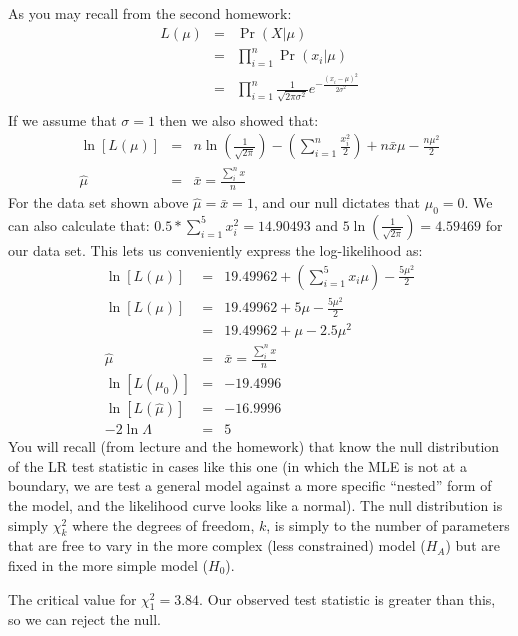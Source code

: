 \documentclass[11pt]{article}
\begin{document}
As you may recall from the second homework:
\begin{eqnarray*}
	L(\mu) & = &\Pr(X|\mu) \\
		& = & \prod_{i=1}^{n}\Pr(x_i|\mu)\\
		& = & \prod_{i=1}^{n}\frac{1}{\sqrt{2\pi\sigma^2}}e^{-\frac{(x_i-\mu)^2}{2\sigma^2}} \\
\end{eqnarray*}
If we assume that $\sigma=1$ then we also showed that:
\begin{eqnarray*}
	\ln [L(\mu)] & = & n\ln\left(\frac{1}{\sqrt{2\pi}}\right) - \left(\sum_{i=1}^{n}\frac{x_i^2}{2}\right) + n\bar{x}\mu - \frac{n\mu^2}{2} \\
	\hat{\mu} & = & \bar{x} = \frac{\sum_i^n x}{n}
\end{eqnarray*}
For the data set shown above $\hat{\mu} = \bar{x} = 1$, and our null dictates that $\mu_0 = 0$.  We can also calculate that: $0.5*\sum_{i=1}^{5}x_i^2 = 14.90493$ and $5\ln\left(\frac{1}{\sqrt{2\pi}}\right) = 4.59469$ for our data set.
This lets us conveniently express the log-likelihood as:
\begin{eqnarray*}
	\ln [L(\mu)] & = & 19.49962 + \left(\sum_{i=1}^{5}x_i\mu\right) - \frac{5\mu^2}{2} \\
	\ln [L(\mu)] & = & 19.49962 + 5\mu - \frac{5\mu^2}{2} \\
		& = & 19.49962 + \mu - 2.5\mu^2 \\
	\hat{\mu} & = & \bar{x} = \frac{\sum_i^n x}{n}\\
	\ln [L(\mu_0)] & = & -19.4996 \\
	\ln [L(\hat{\mu})] & = & -16.9996 \\
	-2\ln\Lambda & = & 5
\end{eqnarray*}
You will recall (from lecture and the homework) that know the null distribution of the LR test statistic in cases like this one (in which the MLE is not at a boundary, we are test a general model against a more specific ``nested'' form of the model, and the likelihood curve looks like a normal).
The null distribution is simply $\chi_k^2$ where the degrees of freedom, $k$, is simply to the number of parameters that are free to vary in the more complex (less constrained) model ($H_A$) but are fixed in the more simple model ($H_0$).

The critical value for $\chi_1^2 = 3.84$.  Our observed test statistic is greater than this, so we can reject the null.
\end{document}
